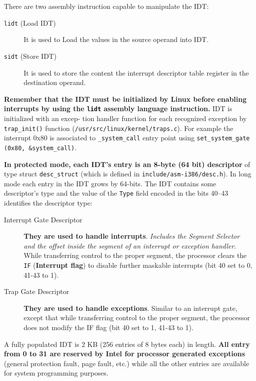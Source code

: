 \documentclass[10pt,a4paper]{article}
\begin{document}
There are two assembly instruction capable to manipulate the IDT:
\begin{description}
\item[\texttt{lidt} (Load IDT)] It is used to Load the values in the source operand into IDT. 
\item[\texttt{sidt} (Store IDT)] It is used to store the content the interrupt descriptor table register in the destination operand.
\end{description}

\textbf{Remember that the IDT must be initialized by Linux before enabling interrupts by using the \texttt{lidt} assembly language instruction.} IDT is initialized with an excep-
tion handler function for each recognized exception by \texttt{trap\_init()} function (\texttt{/usr/src/linux/kernel/traps.c}). For example the interrupt 0x80 is associated to \texttt{\_system\_call} entry point using \texttt{set\_system\_gate (0x80, \&system\_call)}.


\textbf{In protected mode, each IDT's entry is an 8-byte (64 bit) descriptor} of type struct \texttt{desc\_struct} (which is defined in \texttt{include/asm-i386/desc.h}). In long mode each entry in the IDT grows by 64-bits. The IDT contains some descriptor's type and the value of the \texttt{Type} field encoded in the bits 40–43 identifies the descriptor type:
\begin{description}
\item[Interrupt Gate Descriptor] \textbf{They are used to handle interrupts}. \textit{Includes the Segment Selector and the offset inside the segment of an interrupt
or exception handler}. While transferring control to the proper segment, the processor clears the \texttt{IF} (\textbf{Interrupt flag}) to disable further maskable interrupts (bit 40 set to 0, 41-43 to 1). 
\item[Trap Gate Descriptor] \textbf{They are used to handle exceptions}. Similar to an interrupt gate, except that while transferring control to the proper
segment, the processor does not modify the IF flag (bit 40 set to 1, 41-43 to 1).
\end{description}

A fully populated IDT is 2 KB (256 entries of 8 bytes each) in length. \textbf{All entry from 0 to 31 are reserved by Intel for processor generated exceptions} (general protection fault, page fault, etc.) while all the other entries are available for system programming purposes.
\end{document}
